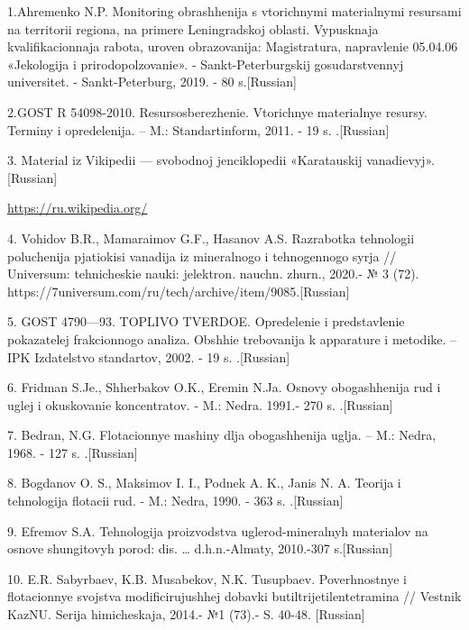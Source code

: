 \begin{noparindent}
1.Ahremenko N.P. Monitoring obrashhenija s vtorichnymi
material\textquotesingle nymi resursami na territorii regiona, na
primere Leningradskoj oblasti. Vypusknaja kvalifikacionnaja rabota,
uroven\textquotesingle{} obrazovanija: Magistratura, napravlenie
05.04.06 «Jekologija i prirodopol\textquotesingle zovanie». -
Sankt-Peterburgskij gosudarstvennyj universitet. - Sankt-Peterburg,
2019. - 80 s.{[}Russian{]}

2.GOST R 54098-2010. Resursosberezhenie. Vtorichnye
material\textquotesingle nye resursy. Terminy i opredelenija. -- M.:
Standartinform, 2011. - 19 s. .{[}Russian{]}

3. Material iz Vikipedii --- svobodnoj jenciklopedii «Karatauskij
vanadievyj».{[}Russian{]}

\href{https://ru.wikipedia.org/wiki/%D0%9A%D0%B0%D1%80%D0%B0%D1%82%D0%B0%D1%83%D1%81%D0%BA%D0%B8%D0%B9_%D0%B2%D0%B0%D0%BD%D0%B0%D0%B4%D0%B8%D0%B5%D0%B2%D1%8B%D0%B9_%D0%B1%D0%B0%D1%81%D1%81%D0%B5%D0%B9%D0%BD}{https://ru.wikipedia.org/}


4. Vohidov B.R., Mamaraimov G.F., Hasanov A.S. Razrabotka tehnologii
poluchenija pjatiokisi vanadija iz mineral\textquotesingle nogo i
tehnogennogo syr\textquotesingle ja // Universum: tehnicheskie nauki:
jelektron. nauchn. zhurn., 2020.- № 3 (72).
https://7universum.com/ru/tech/archive/item/9085.{[}Russian{]}

5. GOST 4790---93. TOPLIVO TVERDOE. Opredelenie i predstavlenie
pokazatelej frakcionnogo analiza. Obshhie trebovanija k apparature i
metodike. -- IPK Izdatel\textquotesingle stvo standartov, 2002. - 19 s.
.{[}Russian{]}

6. Fridman S.Je., Shherbakov O.K., Eremin N.Ja. Osnovy obogashhenija rud
i uglej i okuskovanie koncentratov. - M.: Nedra. 1991.- 270 s.
.{[}Russian{]}

7. Bedran\textquotesingle, N.G. Flotacionnye mashiny dlja obogashhenija
uglja. -- M.: Nedra, 1968. - 127 s. .{[}Russian{]}

8. Bogdanov O. S., Maksimov I. I., Podnek A. K., Janis N. A. Teorija i
tehnologija flotacii rud. - M.: Nedra, 1990. - 363 s. .{[}Russian{]}

9. Efremov S.A. Tehnologija proizvodstva
uglerod-mineral\textquotesingle nyh materialov na osnove shungitovyh
porod: dis. \ldots{} d.h.n.-Almaty, 2010.-307 s.{[}Russian{]}

10. E.R. Sabyrbaev, K.B. Musabekov, N.K. Tusupbaev. Poverhnostnye i
flotacionnye svojstva modificirujushhej dobavki butiltrijetilentetramina
// Vestnik KazNU. Serija himicheskaja, 2014.- №1 (73).- S. 40-48.
{[}Russian{]}


\end{noparindent}
